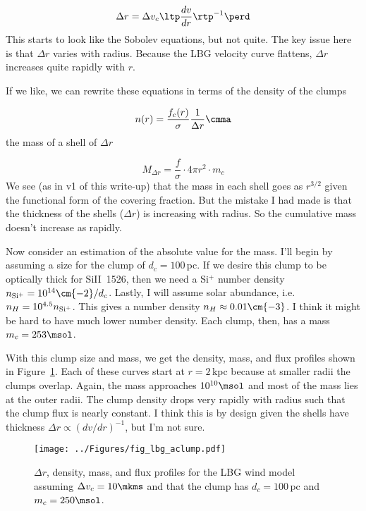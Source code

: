\documentclass[11pt,letterpaper]{article}
\begin{document}
\begin{equation}
\Delta r = \Delta v_c \ltp \frac{dv}{dr} \rtp^{-1}  \perd
\end{equation}
This starts to look like the Sobolev equations, but not quite.  The
key issue here is that $\Delta r$ varies with radius.  Because the LBG
velocity curve flattens, $\Delta r$ increases quite rapidly with $r$.

If we like, we can rewrite these equations in terms of the density of
the clumps

\begin{equation}
n(r) = \frac{f_c(r)}{\sigma} \frac{1}{\Delta r} \cmma
\end{equation}
the mass of a shell of $\Delta r$

\begin{equation}
M_{\Delta r} = \frac{f}{\sigma} \cdot 4 \pi r^2 \cdot m_c
\end{equation}
We see (as in v1 of this write-up) that the mass in each shell goes as
$r^{3/2}$ given the functional form of the covering fraction.  But the
mistake I had made is that the thickness of the shells ($\Delta r$) is
increasing with radius.  So the cumulative mass doesn't increase as
rapidly.   

Now consider an estimation of the absolute value for the mass.  I'll
begin by assuming a size for the clump of $d_c = 100$\,pc.  If we
desire this clump to be optically thick for SiII~1526, then we need a
Si$^+$ number density $n_{\rm Si^+} = 10^{14} \cm{-2} / d_c$.  Lastly,
I will assume solar abundance, i.e. $n_H = 10^{4.5} n_{\rm Si^+}$.
This gives a number density $n_H \approx 0.01 \cm{-3}$.  I think it
might be hard to have much lower number density. Each clump,
then, has a mass $m_c = 253 \msol$. 

With this clump size and mass, we get the density, mass, and flux
profiles shown in Figure~\ref{fig:aclump}.  Each of these curves start
at $r = 2$\,kpc because at smaller radii the clumps overlap.  Again,
the mass approaches $10^{10} \msol$ and most of the mass lies at the
outer radii.  The clump density drops very rapidly with radius such
that the clump flux is nearly constant.  I think this is by design
given the shells have thickness $\Delta r \propto (dv/dr)^{-1}$, but
I'm not sure.

\begin{figure}[ht]
\begin{center}
\texttt{[image: ../Figures/fig\_lbg\_aclump.pdf]}
\end{center}
  \caption{$\Delta r$, density, mass, and flux profiles for the LBG
    wind model assuming $\Delta v_c = 10 \mkms$ and that the clump has
    $d_c = 100$\,pc and $m_c = 250 \msol$.
}
  \label{fig:aclump}
\end{figure}
\end{document}
